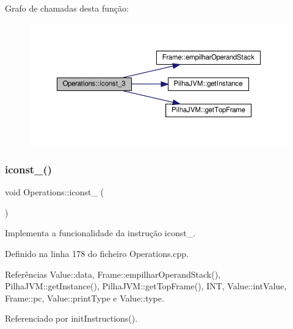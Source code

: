 Grafo de chamadas desta função\+:\nopagebreak
\begin{figure}[H]
\begin{center}
\leavevmode
\includegraphics[width=350pt]{classOperations_ab8466864c000152e75172b623704f610_cgraph}
\end{center}
\end{figure}
\mbox{\label{classOperations_a5fad2dad3d79c889728a6687f36e1192}} 
\subsubsection{\texorpdfstring{iconst\+\_()}{iconst\_4()}}
{\footnotesize\ttfamily void Operations\+::iconst\+\_ (\begin{DoxyParamCaption}{ }\end{DoxyParamCaption})\hspace{0.3cm}{\ttfamily [private]}}



Implementa a funcionalidade da instrução iconst\+\_. 



Definido na linha 178 do ficheiro Operations.\+cpp.



Referências Value\+::data, Frame\+::empilhar\+Operand\+Stack(), Pilha\+J\+V\+M\+::get\+Instance(), Pilha\+J\+V\+M\+::get\+Top\+Frame(), I\+NT, Value\+::int\+Value, Frame\+::pc, Value\+::print\+Type e Value\+::type.



Referenciado por init\+Instructions().

